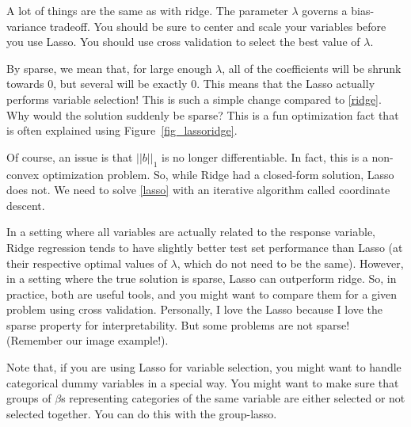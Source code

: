 A lot of things are the same as with ridge. The parameter $\lambda$ governs a bias-variance tradeoff. You should be sure to center and scale your variables before you use Lasso. You should use cross validation to select the best value of $\lambda$. 

By sparse, we mean that, for large enough $\lambda$, all of the coefficients will be shrunk towards $0$, but several will be exactly $0$. This means that the Lasso actually performs variable selection! This is such a simple change compared to \eqref{ridge}. Why would the solution suddenly be sparse? This is a fun optimization fact that is often explained using Figure~\ref{fig_lassoridge}. 

Of course, an issue is that $||b||_1$ is no longer differentiable. In fact, this is a non-convex optimization problem. So, while Ridge had a closed-form solution, Lasso does not. We need to solve \eqref{lasso} with an iterative algorithm called coordinate descent.

In a setting where all variables are actually related to the response variable, Ridge regression tends to have slightly better test set performance than Lasso (at their respective optimal values of $\lambda$, which do not need to be the same). However, in a setting where the true solution is sparse, Lasso can outperform ridge. So, in practice, both are useful tools, and you might want to compare them for a given problem using cross validation. Personally, I love the  Lasso because I love the sparse property for interpretability. But some problems are not sparse! (Remember our image example!). 

Note that, if you are using Lasso for variable selection, you might want to handle categorical dummy variables in a special way. You might want to make sure that groups of $\beta$s representing categories of the same variable are either selected or not selected together. You can do this with the group-lasso. 







